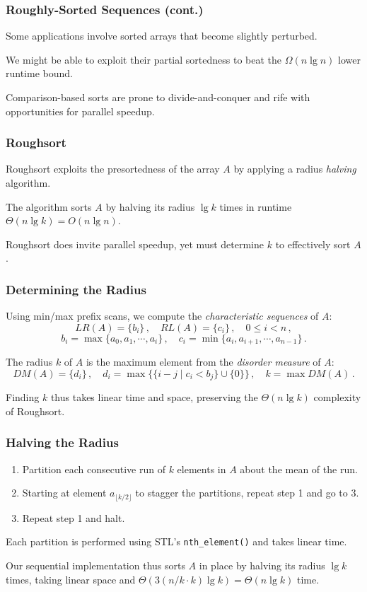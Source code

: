 \documentclass[10pt, xcolor={dvipsnames}, aspectratio=169]{beamer}
\begin{document}
\begin{frame}
\frametitle{Roughly-Sorted Sequences (cont.)}
Some applications involve sorted arrays that become slightly perturbed. \newline

We might be able to exploit their partial sortedness to beat the $\Omega(n \lg n)$ lower runtime bound. \newline

Comparison-based sorts are prone to divide-and-conquer and rife with opportunities for parallel speedup.
\end{frame}

\begin{frame}
\frametitle{Roughsort}
Roughsort exploits the presortedness of the array $A$ by applying a radius \textit{halving} algorithm. \newline

The algorithm sorts $A$ by halving its radius $\lg k$ times in runtime $\Theta(n \lg k) = O(n \lg n)$. \newline

Roughsort does invite parallel speedup, yet must determine $k$ to effectively sort $A$.
\end{frame}

\begin{frame}
\frametitle{Determining the Radius}
Using min/max prefix scans, we compute the \textit{characteristic sequences} of $A$:
$$LR(A) = \{b_i\}\,,\quad RL(A) = \{c_i\}\,,\quad 0 \leq i < n\,,$$
$$b_i = \max\{a_0, a_1, \cdots, a_i\}\,,\quad c_i = \min\{a_i, a_{i+1}, \cdots, a_{n-1}\}\,.$$

The radius $k$ of $A$ is the maximum element from the \textit{disorder measure} of $A$:
$$DM(A) = \{d_i\}\,,\quad d_i = \max\big\{\{i - j \mid c_i < b_j\} \cup \{0\} \big\}\,,\quad k = \max DM(A) \,.$$

Finding $k$ thus takes linear time and space, preserving the $\Theta(n \lg k)$ complexity of Roughsort.
\end{frame}

\begin{frame}
\frametitle{Halving the Radius}
\begin{enumerate}
\item Partition each consecutive run of $k$ elements in $A$ about the mean of the run.
\item Starting at element $a_{\lfloor k/2 \rfloor}$ to stagger the partitions, repeat step 1 and go to 3.
\item Repeat step 1 and halt.
\end{enumerate}

Each partition is performed using STL's \texttt{nth_element()} and takes linear time. \newline

Our sequential implementation thus sorts $A$ in place by halving its radius $\lg k$ times, taking linear space and
  $\Theta(3(n/k \cdot k) \lg k) = \Theta(n \lg k)$ time.
\end{frame}
\end{document}
